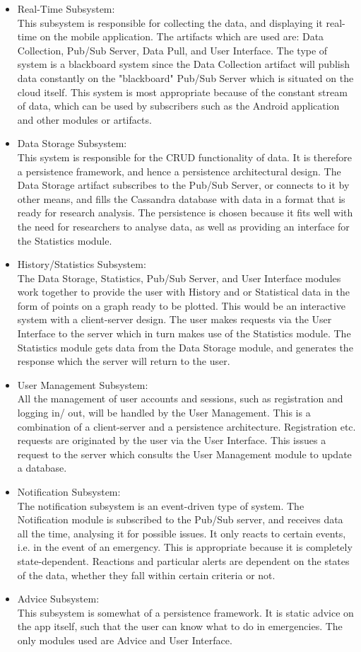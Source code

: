 \begin{itemize}
	\item Real-Time Subsystem:\\
	This subsystem is responsible for collecting the data, and displaying it real-time on the mobile application. The artifacts which are used are: Data Collection,  Pub/Sub Server, Data Pull, and User Interface. The type of system is a blackboard system since the Data Collection artifact will publish data constantly on the "blackboard" Pub/Sub Server which is situated on the cloud itself. This system is most appropriate because of the constant stream of data, which can be used by subscribers such as the Android application and other modules or artifacts. 
	\item Data Storage Subsystem:\\
	This system is responsible for the CRUD functionality of data. It is therefore a persistence framework, and hence a persistence architectural design. The Data Storage artifact subscribes to the Pub/Sub Server, or connects to it by other means, and fills the Cassandra database with data in a format that is ready for research analysis. The persistence is chosen because it fits well with the need for researchers to analyse data, as well as providing an interface for the Statistics module. 
	\item History/Statistics Subsystem:\\
	The Data Storage, Statistics, Pub/Sub Server, and User Interface modules work together to provide the user with History and or Statistical data in the form of points on a graph ready to be plotted. This would be an interactive system with a client-server design. The user makes requests via the User Interface to the server which in turn makes use of the Statistics module. The Statistics module gets data from the Data Storage module, and generates the response which the server will return to the user.
	\item User Management Subsystem:\\
	All the management of user accounts and sessions, such as registration and logging in/ out, will be handled by the User Management. This is a combination of a client-server and a persistence architecture. Registration etc. requests are originated by the user via the User Interface. This issues a request to the server which consults the User Management module to update a database. 
	\item Notification Subsystem:\\
	The notification subsystem is an event-driven type of system. The Notification module is subscribed to the Pub/Sub server, and receives data all the time, analysing it for possible issues. It only reacts to certain events, i.e. in the event of an emergency. This is appropriate because it is completely state-dependent. Reactions and particular alerts are dependent on the states of the data, whether they fall within certain criteria or not.
	\item Advice Subsystem:\\
	This subsystem is somewhat of a persistence framework. It is static advice on the app itself, such that the user can know what to do in emergencies. The only modules used are Advice and User Interface.
\end{itemize}